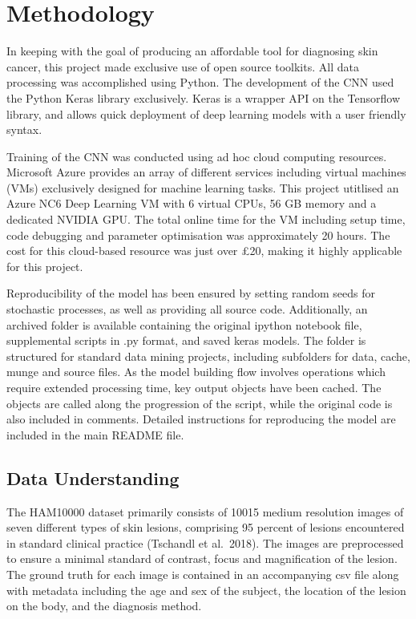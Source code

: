 \documentclass[11pt]{article}
\begin{document}
    \hypertarget{methodology}{%
\section{Methodology}\label{methodology}}

In keeping with the goal of producing an affordable tool for diagnosing
skin cancer, this project made exclusive use of open source toolkits.
All data processing was accomplished using Python. The development of
the CNN used the Python Keras library exclusively. Keras is a wrapper
API on the Tensorflow library, and allows quick deployment of deep
learning models with a user friendly syntax.

Training of the CNN was conducted using ad hoc cloud computing
resources. Microsoft Azure provides an array of different services
including virtual machines (VMs) exclusively designed for machine
learning tasks. This project utitlised an Azure NC6 Deep Learning VM
with 6 virtual CPUs, 56 GB memory and a dedicated NVIDIA GPU. The total
online time for the VM including setup time, code debugging and
parameter optimisation was approximately 20 hours. The cost for this
cloud-based resource was just over £20, making it highly applicable for
this project.

Reproducibility of the model has been ensured by setting random seeds
for stochastic processes, as well as providing all source code.
Additionally, an archived folder is available containing the original
ipython notebook file, supplemental scripts in .py format, and saved
keras models. The folder is structured for standard data mining
projects, including subfolders for data, cache, munge and source files.
As the model building flow involves operations which require extended
processing time, key output objects have been cached. The objects are
called along the progression of the script, while the original code is
also included in comments. Detailed instructions for reproducing the
model are included in the main README file.

\hypertarget{data-understanding}{%
\subsection{Data Understanding}\label{data-understanding}}

The HAM10000 dataset primarily consists of 10015 medium resolution
images of seven different types of skin lesions, comprising 95 percent
of lesions encountered in standard clinical practice (Tschandl et
al.~2018). The images are preprocessed to ensure a minimal standard of
contrast, focus and magnification of the lesion. The ground truth for
each image is contained in an accompanying csv file along with metadata
including the age and sex of the subject, the location of the lesion on
the body, and the diagnosis method.
\end{document}
